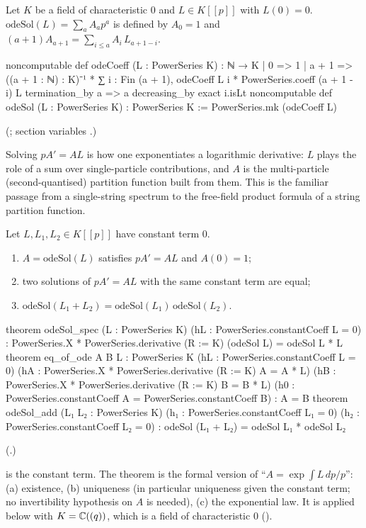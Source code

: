 \begin{definition}[Solution of $pA'=AL$]\label{ch19:def:ode}
Let $K$ be a field of characteristic $0$ and $L\in K[[p]]$ with $L(0)=0$.  $\mathrm{odeSol}(L)=\sum_aA_ap^a$ is defined by
$A_0=1$ and $(a+1)A_{a+1}=\sum_{i\le a}A_i\,L_{a+1-i}$.
\end{definition}
\begin{leancode}
noncomputable def odeCoeff (L : PowerSeries K) : ℕ → K
  | 0 => 1
  | a + 1 => ((a + 1 : ℕ) : K)⁻¹ *
      ∑ i : Fin (a + 1), odeCoeff L i * PowerSeries.coeff (a + 1 - i) L
termination_by a => a
decreasing_by exact i.isLt
noncomputable def odeSol (L : PowerSeries K) : PowerSeries K := PowerSeries.mk (odeCoeff L)
\end{leancode}
(; section variables .)

\begin{physics}
Solving $pA'=AL$ is how one exponentiates a logarithmic derivative: $L$ plays the role of a sum over single-particle
contributions, and $A$ is the multi-particle (second-quantised) partition function built from them. This is the
familiar passage from a single-string spectrum to the free-field product formula of a string partition function.
\end{physics}

\begin{theorem}\label{ch19:thm:ode}
Let $L,L_1,L_2\in K[[p]]$ have constant term $0$.
\begin{enumerate}[label=(\alph*)]
\item $A=\mathrm{odeSol}(L)$ satisfies $pA'=AL$ and $A(0)=1$;
\item two solutions of $pA'=AL$ with the same constant term are equal;
\item $\mathrm{odeSol}(L_1+L_2)=\mathrm{odeSol}(L_1)\,\mathrm{odeSol}(L_2)$.
\end{enumerate}
\end{theorem}
\begin{leancode}
theorem odeSol_spec (L : PowerSeries K) (hL : PowerSeries.constantCoeff L = 0) :
    PowerSeries.X * PowerSeries.derivative (R := K) (odeSol L) = odeSol L * L
theorem eq_of_ode {A B L : PowerSeries K} (hL : PowerSeries.constantCoeff L = 0)
    (hA : PowerSeries.X * PowerSeries.derivative (R := K) A = A * L)
    (hB : PowerSeries.X * PowerSeries.derivative (R := K) B = B * L)
    (h0 : PowerSeries.constantCoeff A = PowerSeries.constantCoeff B) : A = B
theorem odeSol_add (L₁ L₂ : PowerSeries K) (h₁ : PowerSeries.constantCoeff L₁ = 0)
    (h₂ : PowerSeries.constantCoeff L₂ = 0) :
    odeSol (L₁ + L₂) = odeSol L₁ * odeSol L₂
\end{leancode}
(.)
\begin{dictionary}
 is the constant term.  The theorem is the formal version of
``$A=\exp\int L\,dp/p$'': (a) existence, (b) uniqueness (in particular uniqueness given the constant term; no
invertibility hypothesis on $A$ is needed), (c) the exponential law.  It is applied below with $K={\mathbb{C}}((q))$, which is a
field of characteristic $0$ ().
\end{dictionary}
